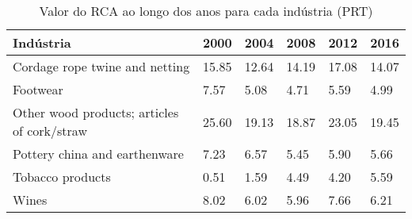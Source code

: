 \begin{table}
\centering
\caption{Valor do RCA ao longo dos anos para cada indústria (PRT)}
\begin{tabular}{p{6cm}p{1.5cm}p{1.5cm}p{1.5cm}p{1.5cm}p{1.5cm}}
\toprule
                                  Indústria &  2000 &  2004 &  2008 &  2012 &  2016 \\
\midrule
             Cordage rope twine and netting & 15.85 & 12.64 & 14.19 & 17.08 & 14.07 \\
                                   Footwear &  7.57 &  5.08 &  4.71 &  5.59 &  4.99 \\
Other wood products; articles of cork/straw & 25.60 & 19.13 & 18.87 & 23.05 & 19.45 \\
              Pottery china and earthenware &  7.23 &  6.57 &  5.45 &  5.90 &  5.66 \\
                           Tobacco products &  0.51 &  1.59 &  4.49 &  4.20 &  5.59 \\
                                      Wines &  8.02 &  6.02 &  5.96 &  7.66 &  6.21 \\
\bottomrule
\end{tabular}
\end{table}
